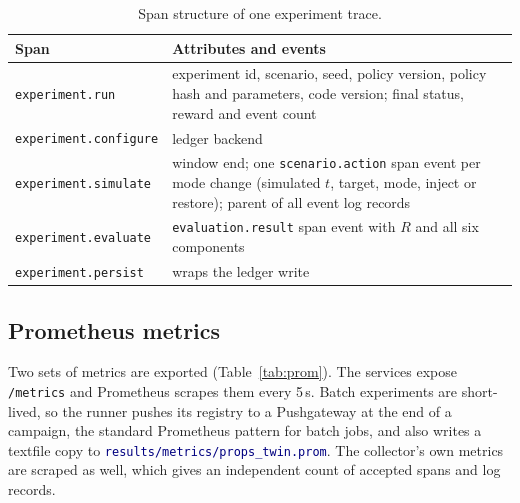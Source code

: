 \documentclass[11pt]{article}
\newcommand{\code}[1]{\texttt{\small #1}}
\newcommand{\file}[1]{\textcolor{navy}{\texttt{\small #1}}}
\begin{document}
\begin{table}[h]
\centering
\caption{Span structure of one experiment trace.}
\label{tab:spans}
\small
\begin{tabular}{>{\RaggedRight\arraybackslash}p{4.0cm} >{\RaggedRight\arraybackslash}p{9.6cm}}
\toprule
\textbf{Span} & \textbf{Attributes and events}\\
\midrule
\code{experiment.run} & experiment id, scenario, seed, policy version, policy hash and parameters, code version; final status, reward and event count\\
\code{experiment.configure} & ledger backend\\
\code{experiment.simulate} & window end; one \code{scenario.action} span event per mode change (simulated $t$, target, mode, inject or restore); parent of all event log records\\
\code{experiment.evaluate} & \code{evaluation.result} span event with $R$ and all six components\\
\code{experiment.persist} & wraps the ledger write\\
\bottomrule
\end{tabular}
\end{table}

\subsection{Prometheus metrics}
Two sets of metrics are exported (Table~\ref{tab:prom}). The services expose
\code{/metrics} and Prometheus scrapes them every 5\,s. Batch experiments are
short-lived, so the runner pushes its registry to a Pushgateway at the end of a
campaign, the standard Prometheus pattern for batch jobs, and also writes a
textfile copy to \file{results/metrics/props\_twin.prom}. The collector's own
metrics are scraped as well, which gives an independent count of accepted spans
and log records.
\end{document}
